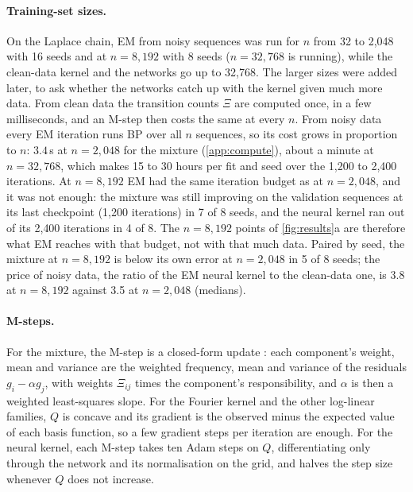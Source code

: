 \documentclass{article}
\begin{document}
\paragraph{Training-set sizes.} On the Laplace chain, EM from noisy sequences was run for $n$ from 32 to 2{,}048 with
16 seeds and at $n=8{,}192$ with 8 seeds ($n=32{,}768$ is running), while the clean-data kernel and the networks go up
to 32{,}768. The larger sizes were added later, to ask whether the
networks catch up with the kernel given much more data. From clean data
the transition counts $\Xi$ are computed once, in a few milliseconds, and an M-step then costs the same at every $n$.
From noisy data every EM iteration runs BP over all $n$ sequences, so its cost grows in proportion to $n$: $3.4$\,s at
$n=2{,}048$ for the mixture (\cref{app:compute}), about a minute at $n=32{,}768$, which makes 15 to 30 hours per fit and
seed over the 1{,}200 to 2{,}400 iterations. At $n=8{,}192$ EM had the same iteration budget as at $n=2{,}048$, and it
was not enough: the mixture was still improving on the validation sequences at its last checkpoint (1{,}200 iterations)
in 7 of 8 seeds, and the neural kernel ran out of its 2{,}400 iterations in 4 of 8. The $n=8{,}192$ points of
\cref{fig:results}a are therefore what EM reaches with that budget, not with that much data. Paired by seed, the mixture
at $n=8{,}192$ is below its own error at $n=2{,}048$ in 5 of 8 seeds; the price of noisy data, the ratio of the EM
neural kernel to the clean-data one, is 3.8 at $n=8{,}192$ against 3.5 at $n=2{,}048$ (medians).

\paragraph{M-steps.} For the mixture, the M-step is a closed-form update \cite{meng1993maximum}: each component's weight,
mean and variance are the weighted frequency, mean and variance of the residuals $g_i-\alpha g_j$, with weights $\Xi_{ij}$
times the component's responsibility, and $\alpha$ is then a weighted least-squares slope. For the Fourier kernel and
the other log-linear families, $Q$ is concave and its gradient is the observed minus the expected value of each basis
function, so a few gradient steps per iteration are enough. For the neural kernel, each M-step takes ten Adam steps on
$Q$, differentiating only through the network and its normalisation on the grid, and halves the step size whenever $Q$
does not increase.
\end{document}

